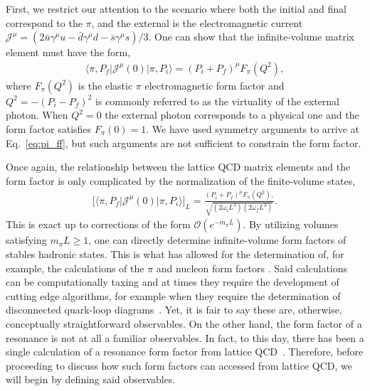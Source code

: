 \documentclass{iopart}
\theoremstyle{definition}
\begin{document}
{First, we restrict our attention to the scenario where both the initial and final correspond to the $\pi$, and the external is the electromagnetic current $\mathcal J^\mu=(2\bar{u}\gamma^\mu u-\bar{d}\gamma^\mu d-\bar{s}\gamma^\mu s)/{3}$. One can show that the infinite-volume matrix element must have the form,
\begin{eqnarray}
\label{eq:pi_ff}
\langle  \pi, P_f \vert  \mathcal J^\mu(0)  \vert \pi, P_i \rangle 
=(P_i+P_f)^\mu F_\pi(Q^2),
\end{eqnarray}
where $F_\pi(Q^2)$ is the elastic $\pi$ electromagnetic form factor and $Q^2=-(P_i-P_f)^2$ is commonly referred to as the virtuality of the external photon. When $Q^2=0$ the external photon corresponds to a physical one and the form factor satisfies $F_\pi(0)=1$. We have used symmetry arguments to arrive at Eq.~\ref{eq:pi_ff}, but such arguments are not sufficient to constrain the form factor. 

Once again, the relationship between the lattice QCD matrix elements and the form factor is only complicated by the normalization of the finite-volume states, 
\begin{eqnarray}
\label{eq:pi_ff_L}
\big[
\langle  \pi, P_f \vert  \mathcal J^\mu(0)  \vert \pi, P_i \rangle\big] _L
=\frac{(P_i+P_f)^\mu F_\pi(Q^2),}{\sqrt{(2\omega_iL^3 )(2\omega_f L^3)}}.
\end{eqnarray}
This is exact up to corrections of the form $\mathcal{O}(e^{-m_\pi L})$. By utilizing volumes satisfying $m_\pi L\geq 1$, one can directly determine infinite-volume form factors of stables hadronic states. This is what has allowed for the determination of, for example, the calculations of the $\pi$ and nucleon form factors \cite{Green:2015wqa, Shultz:2015pfa}. Said calculations can be computationally taxing and at times they require the development of cutting edge algorithms, for example when they require the determination of disconnected quark-loop diagrams~\cite{Green:2015wqa, Gambhir:2016uwp}. Yet, it is fair to say these are, otherwise, conceptually straightforward observables. On the other hand, the form factor of a resonance is not at all a familiar observables. In fact, to this day, there has been a single calculation of a resonance form factor from lattice QCD~\cite{Briceno:2015dca, Briceno:2016kkp}. Therefore, before proceeding to discuss how such form factors can accessed from lattice QCD, we will begin by defining said observables. 





}
\end{document}
